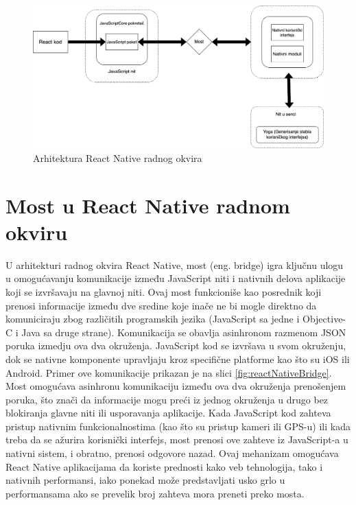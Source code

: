\documentclass[12pt,oneside]{memoir}
\begin{document}
\begin{figure}[h]
    \centering
    \includegraphics[scale=0.4]{docs/images/chapterThree/reactNativeArchitecture.png}
    \caption{Arhitektura React Native radnog okvira}
    \label{fig:reactNativeArchitecture}
\end{figure}

\section{Most u React Native radnom okviru}

U arhitekturi radnog okvira React Native, most\cite[165 - 185]{reactNative} (eng. bridge) igra ključnu ulogu u omogućavanju komunikacije između JavaScript niti i nativnih delova aplikacije koji se izvršavaju na glavnoj niti. Ovaj most funkcioniše kao posrednik koji prenosi informacije između dve sredine koje inače ne bi mogle direktno da komuniciraju zbog različitih programskih jezika (JavaScript sa jedne i Objective-C i Java sa druge strane). Komunikacija se obavlja asinhronom razmenom JSON poruka izmedju ova dva okruženja. JavaScript kod se izvršava u svom okruženju, dok se nativne komponente upravljaju kroz specifične platforme kao što su iOS ili Android. Primer ove komunikacije prikazan je na slici \ref{fig:reactNativeBridge}. Most omogućava asinhronu komunikaciju između ova dva okruženja prenošenjem poruka, što znači da informacije mogu preći iz jednog okruženja u drugo bez blokiranja glavne niti ili usporavanja aplikacije. Kada JavaScript kod zahteva pristup nativnim funkcionalnostima (kao što su pristup kameri ili GPS-u) ili kada treba da se ažurira korisnički interfejs, most prenosi ove zahteve iz JavaScript-a u nativni sistem, i obratno, prenosi odgovore nazad. Ovaj mehanizam omogućava React Native aplikacijama da koriste prednosti kako veb tehnologija, tako i nativnih performansi, iako ponekad može predstavljati usko grlo u performansama ako se prevelik broj zahteva mora preneti preko mosta.
\end{document}
